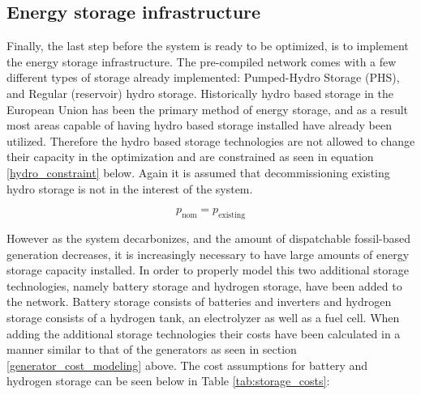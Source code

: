 \documentclass[preprint,12pt,nopreprintline]{elsarticle}
\begin{document}
\subsection{Energy storage infrastructure}
\noindent
Finally, the last step before the system is ready to be optimized, is to implement the energy storage infrastructure. The pre-compiled network comes with a few different types of storage already implemented: Pumped-Hydro Storage (PHS), and Regular (reservoir) hydro storage. Historically hydro based storage in the European Union has been the primary method of energy storage, and as a result most areas capable of having hydro based storage installed have already been utilized. Therefore the hydro based storage technologies are not allowed to change their capacity in the optimization and are constrained as seen in equation \eqref{hydro_constraint} below. Again it is assumed that decommissioning existing hydro storage is not in the interest of the system.

\begin{equation}
p_{\text{nom}} = p_{\text{existing}}
\label{hydro_constraint}
\end{equation}

\medskip
\noindent
However as the system decarbonizes, and the amount of dispatchable fossil-based generation decreases, it is increasingly necessary to have large amounts of energy storage capacity installed. In order to properly model this two additional storage technologies, namely battery storage and hydrogen storage, have been added to the network. Battery storage consists of batteries and inverters and hydrogen storage consists of a hydrogen tank, an electrolyzer as well as a fuel cell. When adding the additional storage technologies their costs have been calculated in a manner similar to that of the generators as seen in section \ref{generator_cost_modeling} above. The cost assumptions for battery and hydrogen storage can be seen below in Table \ref{tab:storage_costs}:

\begin{table}[H]
\centering
\caption{Storage technology cost assumptions used in the optimization model \cite{TechnologyDataEnergy2024}.}
\label{tab:storage_costs}
\end{table}
\end{document}
